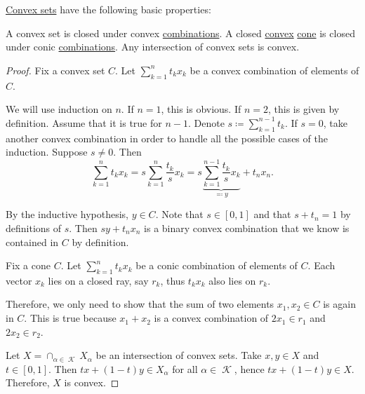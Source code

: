 \begin{proposition}\label{thm:def:convex_set}
  \hyperref[def:convex_set]{Convex sets} have the following basic properties:

  \begin{thmenum}
     A convex set is closed under convex \hyperref[def:convex_combination]{combinations}.
     A closed \hyperref[def:convex_set]{convex} \hyperref[def:geometric_cone]{cone} is closed under conic \hyperref[def:convex_combination/conic]{combinations}.
     Any intersection of convex sets is convex.
  \end{thmenum}
\end{proposition}
\begin{proof}
   Fix a convex set \( C \). Let \( \sum_{k=1}^n t_k x_k \) be a convex combination of elements of \( C \).

  We will use induction on \( n \). If \( n = 1 \), this is obvious. If \( n = 2 \), this is given by definition. Assume that it is true for \( n - 1 \). Denote \( s \coloneqq \sum_{k=1}^{n-1} t_k \). If \( s = 0 \), take another convex combination in order to handle all the possible cases of the induction. Suppose \( s \neq 0 \). Then
  \begin{equation*}
    \sum_{k=1}^n t_k x_k
    =
    s \sum_{k=1}^n \frac{t_k} s x_k
    =
    s \underbrace{\sum_{k=1}^{n-1} \frac{t_k} s x_k}_{\eqqcolon y} + t_n x_n.
  \end{equation*}

  By the inductive hypothesis, \( y \in C \). Note that \( s \in [0, 1] \) and that \( s + t_n = 1 \) by definitions of \( s \). Then \( s y + t_n x_n \) is a binary convex combination that we know is contained in \( C \) by definition.

   Fix a cone \( C \). Let \( \sum_{k=1}^n t_k x_k \) be a conic combination of elements of \( C \). Each vector \( x_k \) lies on a closed ray, say \( r_k \), thus \( t_k x_k \) also lies on \( r_k \).

  Therefore, we only need to show that the sum of two elements \( x_1, x_2 \in C \) is again in \( C \). This is true because \( x_1 + x_2 \) is a convex combination of \( 2x_1 \in r_1 \) and \( 2x_2 \in r_2 \).

   Let \( X = \cap_{\alpha \in \mscrK} X_\alpha \) be an intersection of convex sets. Take \( x, y \in X \) and \( t \in [0, 1] \). Then \( tx + (1-t)y \in X_\alpha \) for all \( \alpha \in \mscrK \), hence \( tx + (1-t)y \in X \). Therefore, \( X \) is convex.
\end{proof}

